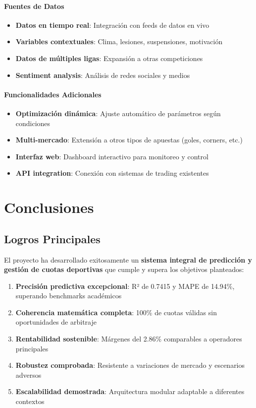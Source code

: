 \documentclass{article}
\begin{document}
\paragraph{Fuentes de Datos}
\begin{itemize}
    \item \textbf{Datos en tiempo real}: Integración con feeds de datos en vivo
    \item \textbf{Variables contextuales}: Clima, lesiones, suspensiones, motivación
    \item \textbf{Datos de múltiples ligas}: Expansión a otras competiciones
    \item \textbf{Sentiment analysis}: Análisis de redes sociales y medios
\end{itemize}

\paragraph{Funcionalidades Adicionales}
\begin{itemize}
    \item \textbf{Optimización dinámica}: Ajuste automático de parámetros según condiciones
    \item \textbf{Multi-mercado}: Extensión a otros tipos de apuestas (goles, corners, etc.)
    \item \textbf{Interfaz web}: Dashboard interactivo para monitoreo y control
    \item \textbf{API integration}: Conexión con sistemas de trading existentes
\end{itemize}

\section{Conclusiones}

\subsection{Logros Principales}

El proyecto ha desarrollado exitosamente un \textbf{sistema integral de predicción y gestión de cuotas deportivas} que cumple y supera los objetivos planteados:

\begin{enumerate}
    \item \textbf{Precisión predictiva excepcional}: R² de 0.7415 y MAPE de 14.94\%, superando benchmarks académicos
    \item \textbf{Coherencia matemática completa}: 100\% de cuotas válidas sin oportunidades de arbitraje
    \item \textbf{Rentabilidad sostenible}: Márgenes del 2.86\% comparables a operadores principales
    \item \textbf{Robustez comprobada}: Resistente a variaciones de mercado y escenarios adversos
    \item \textbf{Escalabilidad demostrada}: Arquitectura modular adaptable a diferentes contextos
\end{enumerate}
\end{document}

